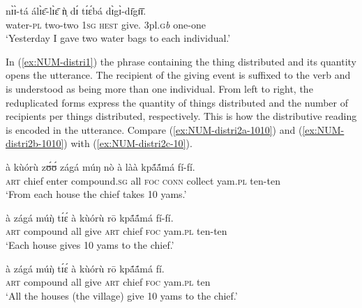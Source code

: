 \begin{exe}
\begin{exe}
\begin{exe}
\begin{exe}
\begin{exe}
\begin{exe}
\begin{exe}
\begin{exe}
\begin{exe}
\begin{exe}
\begin{exe}
\ex\label{ex:NUM-distri1}
 \gll  nɪ̀ɪ̀-tá álɪ̀ɛ̄-lɪ̀ɛ̄  ǹ̩  dɪ́ tɪ́ɛ́bá dɪ̀gɪ̀-dɪ̄gɪ̄ɪ̄.\\
  {water-\textsc{pl}} {two-two}   \textsc{1sg}   \textsc{hest}   {give.\sc
3pl.\textsc{g}\textit{b}} {one-one}\\
\glt  `Yesterday I gave two water bags to each individual.'\\
\end{exe}


In (\ref{ex:NUM-distri1}) the phrase containing the thing distributed and
its quantity opens the utterance. The recipient of the giving event is suffixed to the verb and 
is understood  as being more than one individual. From left to right, the reduplicated forms express the
quantity of things distributed and the number of recipients per things
distributed, respectively. This is how the distributive reading is
encoded in the utterance. Compare (\ref{ex:NUM-distri2a-1010}) and
(\ref{ex:NUM-distri2b-1010}) with
(\ref{ex:NUM-distri2c-10}).

 
\begin{exe}
\ex\label{ex:NUM-distri2-10}
\begin{xlist}
 
\ex\label{ex:NUM-distri2a-1010}
\gll à kùórù  zʊ́ʊ́ zágá  múŋ  nò  à làà kpã́ã́má fí-fí.\\
  \textsc{art}  {chief}  {enter}  {compound.\textsc{sg}}   {all}  \textsc{foc} 
\textsc{conn}  {collect}  {yam.\textsc{pl}}  {ten-ten}\\%
\glt  `From each house the chief takes 10 yams.'

\ex\label{ex:NUM-distri2b-1010}
\gll à  zágá  múŋ̀ tɪ́ɛ́  à  kùórù rō  kpã́ã́má fí-fí.\\
  \textsc{art} {compound} {all} {give}  \textsc{art}  {chief}  \textsc{foc}
yam.\textsc{pl}  {ten-ten}\\
\glt  `Each house gives 10 yams to the chief.'

\ex\label{ex:NUM-distri2c-10}
\gll à  zágá  múŋ̀ tɪ́ɛ́  à  kùórù rō kpã́ã́má fí.\\
  \textsc{art} {compound} {all} {give}  \textsc{art}  {chief}  \textsc{foc}
yam.\textsc{pl}  ten\\
\glt  `All the houses (the village) give 10 yams to the chief.'
\end{xlist}
\end{exe}



\end{exe}
\end{exe}
\end{exe}
\end{exe}
\end{exe}
\end{exe}
\end{exe}
\end{exe}
\end{exe}
\end{exe}
